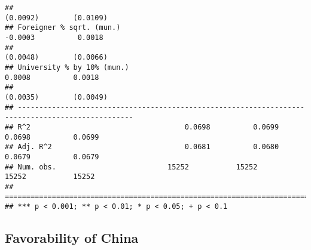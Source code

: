 \documentclass[
]{article}
\begin{document}
\begin{verbatim}
##                                                                       (0.0092)        (0.0109)   
## Foreigner % sqrt. (mun.)                                              -0.0003          0.0018    
##                                                                       (0.0048)        (0.0066)   
## University % by 10% (mun.)                                             0.0008          0.0018    
##                                                                       (0.0035)        (0.0049)   
## -------------------------------------------------------------------------------------------------
## R^2                                    0.0698          0.0699          0.0698          0.0699    
## Adj. R^2                               0.0681          0.0680          0.0679          0.0679    
## Num. obs.                          15252           15252           15252           15252         
## =================================================================================================
## *** p < 0.001; ** p < 0.01; * p < 0.05; + p < 0.1
\end{verbatim}

\hypertarget{favorability-of-china-1}{%
\subsection{Favorability of China}\label{favorability-of-china-1}}
\end{document}
